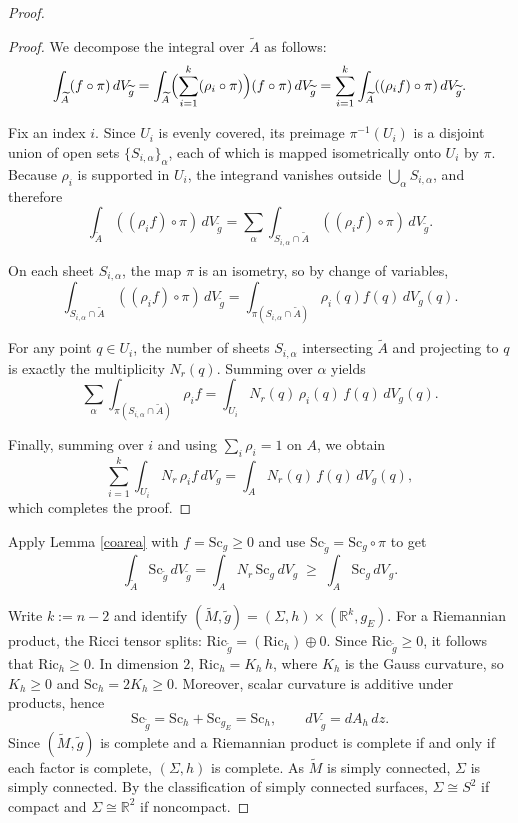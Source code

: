 \documentclass[12pt,oneside,a4paper]{article}
\theoremstyle{mytheorem}
\theoremstyle{remark}
\begin{document}
\begin{proof}
\begin{proof}
We decompose the integral over $\widetilde A$ as follows:
\[
\int_{\widetilde A} (f\circ \pi)\, dV_{\widetilde g}
=
\int_{\widetilde A} \Bigl(\sum_{i=1}^k (\rho_i\circ \pi)\Bigr)(f\circ \pi)\, dV_{\widetilde g}
=
\sum_{i=1}^k \int_{\widetilde A} ((\rho_i f)\circ \pi)\, dV_{\widetilde g}.
\]

Fix an index $i$. Since $U_i$ is evenly covered, its preimage
$\pi^{-1}(U_i)$ is a disjoint union of open sets $\{S_{i,\alpha}\}_\alpha$,
each of which is mapped isometrically onto $U_i$ by $\pi$.
Because $\rho_i$ is supported in $U_i$, the integrand vanishes outside
$\bigcup_\alpha S_{i,\alpha}$, and therefore
\[
\int_{\widetilde A} ((\rho_i f)\circ \pi)\, dV_{\widetilde g}
=
\sum_\alpha
\int_{S_{i,\alpha}\cap \widetilde A} ((\rho_i f)\circ \pi)\, dV_{\widetilde g}.
\]

On each sheet $S_{i,\alpha}$, the map $\pi$ is an isometry, so by change of variables,
\[
\int_{S_{i,\alpha}\cap \widetilde A} ((\rho_i f)\circ \pi)\, dV_{\widetilde g}
=
\int_{\pi(S_{i,\alpha}\cap \widetilde A)} \rho_i(q) f(q)\, dV_g(q).
\]

For any point $q\in U_i$, the number of sheets $S_{i,\alpha}$ intersecting
$\widetilde A$ and projecting to $q$ is exactly the multiplicity $N_r(q)$.
Summing over $\alpha$ yields
\[
\sum_\alpha
\int_{\pi(S_{i,\alpha}\cap \widetilde A)} \rho_i f
=
\int_{U_i} N_r(q)\, \rho_i(q)\, f(q)\, dV_g(q).
\]

Finally, summing over $i$ and using $\sum_i \rho_i=1$ on $A$, we obtain
\[
\sum_{i=1}^k \int_{U_i} N_r\, \rho_i f\, dV_g
=
\int_A N_r(q)\, f(q)\, dV_g(q),
\]
which completes the proof.
\end{proof}







Apply Lemma \ref{coarea} with $f=\mathrm{Sc}_g\ge 0$ and use
$\mathrm{Sc}_{\widetilde g}=\mathrm{Sc}_g\circ \pi$ to get
\begin{equation}\label{eq:pushdown-fixed}
\int_{\widetilde A} \mathrm{Sc}_{\widetilde g}\,dV_{\widetilde g}
=
\int_A N_r\,\mathrm{Sc}_g\,dV_g
\;\ge\;
\int_A \mathrm{Sc}_g\,dV_g.
\end{equation}



Write $k:=n-2$ and identify $(\widetilde M,\widetilde g)=(\Sigma,h)\times(\mathbb R^k,g_E).$ For a Riemannian product, the Ricci tensor splits:
$\mathrm{Ric}_{\widetilde g} = (\mathrm{Ric}_h)\oplus 0.$
Since $\mathrm{Ric}_{\widetilde g}\ge 0$, it follows that $\mathrm{Ric}_h\ge 0$.
In dimension $2$, $\mathrm{Ric}_h = K_h\,h$, where $K_h$ is the Gauss curvature,
so $K_h\ge 0$ and $\mathrm{Sc}_h = 2K_h\ge 0$.
Moreover, scalar curvature is additive under products, hence
\[
\mathrm{Sc}_{\widetilde g} = \mathrm{Sc}_h + \mathrm{Sc}_{g_E}
=\mathrm{Sc}_h,
\qquad
dV_{\widetilde g}=dA_h\,dz.
\]
Since $(\widetilde M,\widetilde g)$ is complete  and a Riemannian
product is complete if and only if  each factor is complete,  $(\Sigma,h)$ is complete. 
 As $\widetilde M$ is simply connected, $\Sigma$ is simply connected. By the classification of simply connected
surfaces, $\Sigma\cong S^2$ if compact and $\Sigma\cong \mathbb R^2$ if noncompact.


\end{proof}
\end{document}
